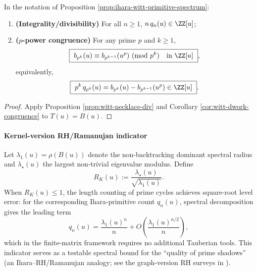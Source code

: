 \begin{corollary}\label{cor:ihara-witt-dwork}
In the notation of Proposition \ref{prop:ihara-witt-primitive-spectrum}:
\begin{enumerate}
  \item \textbf{(Integrality/divisibility)} For all \(n\ge 1\), \(n\,q_n(u)\in\ZZ[u]\);
  \item \textbf{(\(p\)-power congruence)} For any prime \(p\) and \(k\ge 1\),
  \[
  \boxed{\ b_{p^k}(u)\equiv b_{p^{k-1}}(u^p)\ (\mathrm{mod}\ p^k)\quad\text{in }\ZZ[u]\ },
  \]
  equivalently,
  \[
  \boxed{\ p^k\,q_{p^k}(u)=b_{p^k}(u)-b_{p^{k-1}}(u^p)\in\ZZ[u]\ }.
\]
\end{enumerate}
\end{corollary}
\begin{proof}
Apply Proposition \ref{prop:witt-necklace-div} and Corollary \ref{cor:witt-dwork-congruence} to \(T(u)=B(u)\). \qedhere
\end{proof}

\paragraph{Kernel-version RH/Ramanujan indicator}
Let $\lambda_1(u)=\rho(B(u))$ denote the non-backtracking dominant spectral radius and $\lambda_\star(u)$ the largest non-trivial eigenvalue modulus. Define
\[
R_K(u):=\frac{\lambda_\star(u)}{\sqrt{\lambda_1(u)}}.
\]
When $R_K(u)\le 1$, the length counting of prime cycles achieves square-root level error: for the corresponding Ihara-primitive count $q_n(u)$, spectral decomposition gives the leading term
\[
q_n(u)=\frac{\lambda_1(u)^n}{n}+O\!\left(\frac{\lambda_1(u)^{n/2}}{n}\right),
\]
which in the finite-matrix framework requires no additional Tauberian tools. This indicator serves as a testable spectral bound for the ``quality of prime shadows'' (an Ihara--RH/Ramanujan analogy; see the graph-version RH surveys in \cite{TerrasZetaGraphs,StarkTerras1996GraphCoverings}).

